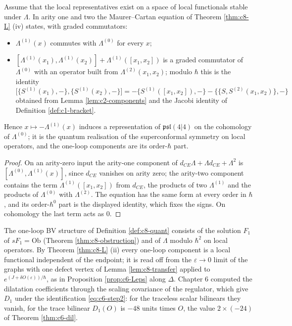 \begin{corollary}
\label{cor:c8-homotopy}
Assume that the local representatives exist on a space of local functionals stable under $\Lambda$. In arity one and two the Maurer--Cartan equation of Theorem \ref{thm:c8-L} (iv) states, with graded commutators:
\begin{itemize}
\item[(i)] $\Lambda^{(1)}(x)$ commutes with $\Lambda^{(0)}$ for every $x$;
\item[(ii)] $[\Lambda^{(1)}(x_1),\Lambda^{(1)}(x_2)]+\Lambda^{(1)}([x_1,x_2])$ is a graded commutator of $\Lambda^{(0)}$ with an operator built from $\Lambda^{(2)}(x_1,x_2)$; modulo $\hbar$ this is the identity
\[
\big[\{S^{(1)}(x_1),-\},\{S^{(1)}(x_2),-\}\big]=-\{S^{(1)}([x_1,x_2]),-\}-\big\{\{S,S^{(2)}(x_1,x_2)\},-\big\}
\]
obtained from Lemma \ref{lem:c2-components} and the Jacobi identity of Definition \ref{def:c1-bracket}.
\end{itemize}
Hence $x\mapsto-\Lambda^{(1)}(x)$ induces a representation of $\mathfrak{psl}(4|4)$ on the cohomology of $\Lambda^{(0)}$; it is the quantum realisation of the superconformal symmetry on local operators, and the one-loop components are its order-$\hbar$ part.
\end{corollary}

\begin{proof}
On an arity-zero input the arity-one component of $d_{CE}\Lambda+\Lambda d_{CE}+\Lambda^2$ is $[\Lambda^{(0)},\Lambda^{(1)}(x)]$, since $d_{CE}$ vanishes on arity zero; the arity-two component contains the term $\Lambda^{(1)}([x_1,x_2])$ from $d_{CE}$, the products of two $\Lambda^{(1)}$ and the products of $\Lambda^{(0)}$ with $\Lambda^{(2)}$. The equation has the same form at every order in $\hbar$, and its order-$\hbar^0$ part is the displayed identity, which fixes the signs. On cohomology the last term acts as $0$.
\end{proof}

\begin{remark}
The one-loop BV structure of Definition \ref{def:c8-quant} consists of the solution $F_1$ of $sF_1=\mathrm{Ob}$ (Theorem \ref{thm:c8-obstruction}) and of $\Lambda$ modulo $\hbar^2$ on local operators. By Theorem \ref{thm:c8-L} (ii) every one-loop component is a local functional independent of the endpoint; it is read off from the $\varepsilon\to0$ limit of the graphs with one defect vertex of Lemma \ref{lem:c8-transfer} applied to $e^{(J+\delta O(\varepsilon))/\hbar}$, as in Proposition \ref{prop:c6-Leps} along $\Delta$. Chapter 6 computed the dilatation coefficients through the scaling covariance of the regulator, which give $D_1$ under the identification \eqref{eq:c6-step2}: for the traceless scalar bilinears they vanish, for the trace bilinear $D_1(O)$ is $-48$ units times $O$, the value $2\times(-24)$ of Theorem \ref{thm:c6-dil}.
\end{remark}

